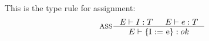 %
%

This is the type rule for assignment:
\begin{align*}
&\inference[ASS]{\Tenv I : T & \Tenv e: T}
                 {\Tenv \text{\{I := e\}} : ok}
\\\\
\end{align*}
